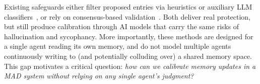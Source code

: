 

Existing safeguards either filter proposed entries via heuristics or auxiliary LLM classifiers~\citep{alon2023detecting,wang2024self}, or rely on consensus-based validation~\citep{wei2025memguard}. Both deliver real protection, but still produce calibration through AI models that carry the same risks of hallucination and sycophancy. More importantly, these methods are designed for a single agent reading its own memory, and do not model multiple agents continuously writing to (and potentially colluding over) a shared memory space. This gap motivates a critical question: \emph{how can we calibrate memory updates in a MAD system without relying on any single agent's judgment?}

